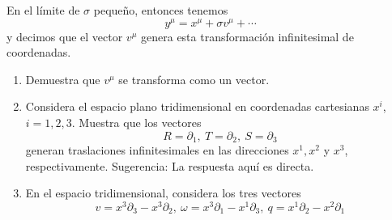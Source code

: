 \documentclass[../main]{subfiles}
\begin{document}
\begin{adjustwidth}{0pt}{-100pt}
\begin{enumerate}
    En el límite de $\sigma$ pequeño, entonces tenemos 
    \begin{equation}
        y^{\mu}=x^{\mu}+\sigma v^{\mu}+\cdots 
    \end{equation}
    y decimos que el vector $v^{\mu}$ genera esta transformación infinitesimal de coordenadas. 
    \begin{enumerate}
        \item Demuestra que $v^{\mu}$ se transforma como un vector.
        \item Considera el espacio plano tridimensional en coordenadas cartesianas $x^{i}$, $i=1, 2, 3$. Muestra que los vectores 
        \begin{equation}
            R=\partial_1, \ T=\partial_2, \ S=\partial_3
        \end{equation}
        generan traslaciones infinitesimales en las direcciones $x^1, x^2$ y $x^3$, respectivamente. Sugerencia: La respuesta aquí es directa.
        \item En el espacio tridimensional, considera los tres vectores 
        \begin{equation}
            v=x^3\partial_3-x^3\partial_2, \ \omega=x^3\partial_1-x^1\partial_3, \ q=x^1\partial_2-x^2\partial_1
        \end{equation}


\end{enumerate}
\end{enumerate}
\end{adjustwidth}
\end{document}
